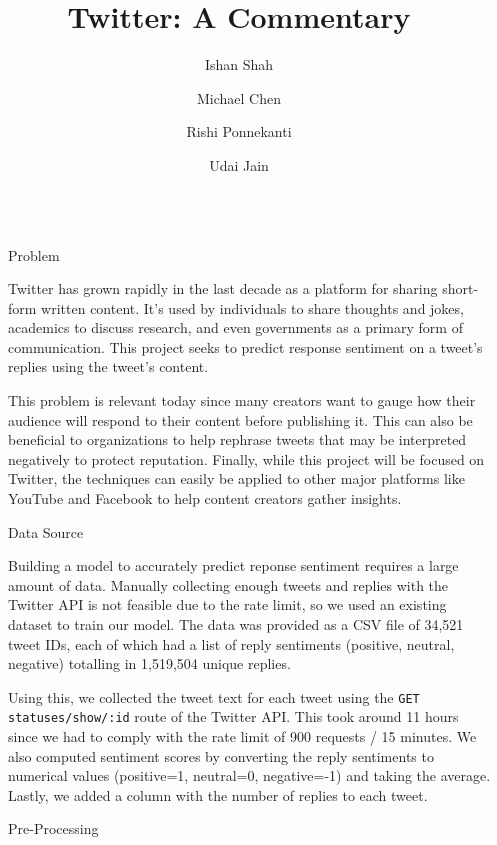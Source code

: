 \documentclass[final]{beamer}
\title{Twitter: A Commentary}
\author{Ishan Shah \and Michael Chen \and Rishi Ponnekanti \and Udai Jain}
\institute[shortinst]{The University of Texas at Austin}
\def\code#1{\texttt{#1}}
\newlength{\sepwidth}
\newlength{\colwidth}
\newcommand{\separatorcolumn}{\begin{column}{\sepwidth}\end{column}}
\begin{document}
\begin{frame}[t]
\begin{columns}[t]
\separatorcolumn

\begin{column}{\colwidth}

  \begin{block}{Problem}

    Twitter has grown rapidly in the last decade as a platform for sharing short-form written content. It’s used by individuals to share thoughts and jokes, academics to discuss research, and even governments as a primary form of communication. This project seeks to predict response sentiment on a tweet’s replies using the tweet’s content.

    This problem is relevant today since many creators want to gauge how their audience will respond to their content before publishing it. This can also be beneficial to organizations to help rephrase tweets that may be interpreted negatively to protect reputation. Finally, while this project will be focused on Twitter, the techniques can easily be applied to other major platforms like YouTube and Facebook to help content creators gather insights.

  \end{block}

  \begin{block}{Data Source}

    Building a model to accurately predict reponse sentiment requires a large amount of data. Manually collecting enough tweets and replies with the Twitter API is not feasible due to the rate limit, so we used an existing dataset \cite{RETWEET} to train our model. The data was provided as a CSV file of 34,521 tweet IDs, each of which had a list of reply sentiments (positive, neutral, negative) totalling in 1,519,504 unique replies.
    
    Using this, we collected the tweet text for each tweet using the \code{GET statuses/show/:id} route of the Twitter API. This took around 11 hours since we had to comply with the rate limit of 900 requests / 15 minutes. We also computed sentiment scores by converting the reply sentiments to numerical values (positive=1, neutral=0, negative=-1) and taking the average. Lastly, we added a column with the number of replies to each tweet.

  \end{block}

  \begin{block}{Pre-Processing}


\end{block}
\end{column}
\end{columns}
\end{frame}
\end{document}
